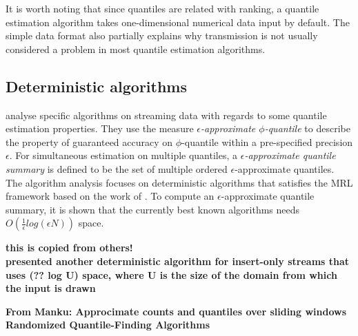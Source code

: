 It is worth noting that since quantiles are related with ranking, a quantile estimation algorithm takes one-dimensional numerical data input by default. The simple data format also partially explains why transmission is not usually considered a problem in most quantile estimation algorithms.
\subsection{Deterministic algorithms}
\label{deterministic}

\citeauthor{greenwaldQuantilesEquidepthHistograms2016a}\cite{greenwaldQuantilesEquidepthHistograms2016a} analyse specific algorithms on streaming data with regards to some quantile estimation properties. 
They use the measure \textit{$\epsilon$-approximate $\phi$-quantile} to describe the property of guaranteed accuracy on $\phi$-quantile within a pre-specified precision $\epsilon$. 
For simultaneous estimation on multiple quantiles, a \textit{$\epsilon$-approximate quantile summary} is defined to be the set of multiple ordered $\epsilon$-approximate quantiles.
The algorithm analysis focuses on deterministic algorithms that satisfies the MRL framework based on the work of \citeauthor{mankuApproximateMediansOthera} \cite{mankuApproximateMediansOthera}. To compute an $\epsilon$-approximate quantile summary, it is shown that the currently best known algorithms needs $O(\frac{1}{\epsilon}log(\epsilon N))$ space.

\textbf{ this is copied from others!\\
    \citeauthor{shrivastavaMediansNewAggregation2004} \cite{shrivastavaMediansNewAggregation2004}
        presented another deterministic algorithm for insert-only streams that uses (?? log U) space, where U is the size of the domain from which the input is drawn
    }

\textbf{ From Manku: Approcimate counts and quantiles over sliding windows
    Randomized Quantile-Finding Algorithms
}



